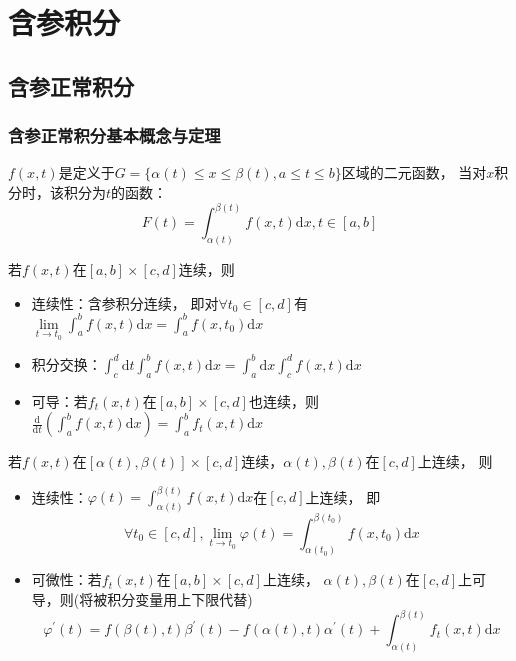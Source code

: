 

\chapter{含参积分}

\section{含参正常积分}

\subsection{含参正常积分基本概念与定理}

\begin{definition}[含参正常积分]
  $f(x,t)$是定义于$G = \{\alpha(t) \leq x \leq \beta(t), a \leq t \leq b\}$区域的二元函数，
  当对$x$积分时，该积分为$t$的函数：
  \begin{equation*}
    F(t) = \int_{\alpha(t)}^{\beta(t)} f(x,t) \mathrm{d} x, t \in [a,b]
  \end{equation*}
\end{definition}

\begin{theorem}[规则区域含参正常积分性质]
  若$f(x,t)$在$[a,b] \times [c,d]$连续，则
  \begin{itemize}
  \item 连续性：含参积分连续，
    即对$\forall t_0 \in [c,d]$有$\lim \limits _{t \rightarrow t_0} \int_a^b f(x,t)\mathrm{d} x = \int_a^b f(x,t_0)\mathrm{d} x$
  \item 积分交换：$\int_c^d \mathrm{d} t \int_a^b f(x,t)\mathrm{d} x = \int_a^b \mathrm{d} x \int_c^d f(x,t)\mathrm{d} x$
  \item 可导：若$f_t(x,t)$在$[a,b] \times [c,d]$也连续，则
    $ \frac{\mathrm{d} }{\mathrm{d} t}\left(  \int_a^b f(x,t)\mathrm{d}x\right) = \int_a^b f_t(x,t)\mathrm{d}x  $
  \end{itemize}
\end{theorem}

\begin{theorem}[不规则区域的连续与可微性]
  若$f(x,t)$在$[\alpha(t),\beta(t)] \times [c,d]$连续，$\alpha(t),\beta(t)$在$[c,d]$上连续，
  则
  \begin{itemize}
  \item 连续性：$\varphi(t) = \int_{\alpha(t)}^{\beta(t)} f(x,t)\mathrm{d} x$在$[c,d]$上连续，
    即
    \begin{equation*}
      \forall t_0 \in [c,d], \lim \limits _{t \rightarrow t_0}\varphi(t) = \int_{\alpha(t_0)}^{\beta(t_0)} f(x,t_0)\mathrm{d}x
    \end{equation*}
  \item 可微性：若$f_t(x,t)$在$[a,b] \times [c,d]$上连续，
    $\alpha(t),\beta(t)$在$[c,d]$上可导，则(将被积分变量用上下限代替)
    \begin{equation*}
      \varphi^{\prime}(t) = f(\beta(t),t)\beta^{\prime}(t) - f(\alpha(t),t)\alpha^{\prime}(t) + \int_{\alpha(t)}^{\beta(t)}f_t(x,t)\mathrm{d} x
    \end{equation*}
  \end{itemize}
\end{theorem}

